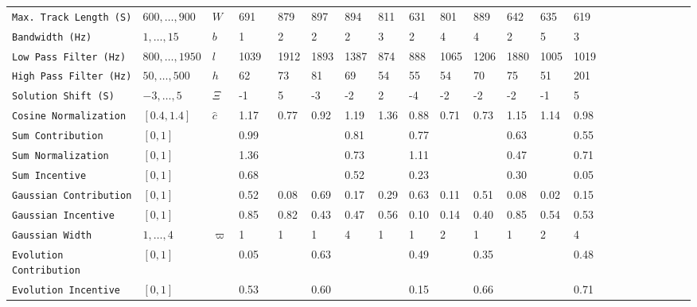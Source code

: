 \documentclass[twocolumn]{article}
\begin{document}
\begin{table}[h]
{\begin{tabular}{llll@{}llllllllllllllllll@{}}
		\texttt{Max. Track Length (S) }     & $600,\ldots,900$  & $W$        & 691   & 879  & 897  & 894  & 811  & 631  & 801  & 889  & 642  & 635  & 619  &  \\
		\texttt{Bandwidth (Hz)      }       & $1,\ldots,15$     & $b$        & 1     & 2    & 2    & 2    & 3    & 2    & 4    & 4    & 2    & 5    & 3    &  \\
		\texttt{Low Pass Filter (Hz) }      & $800,\ldots,1950$ & $l$        & 1039~ & 1912 & 1893 & 1387 & 874  & 888  & 1065 & 1206 & 1880 & 1005 & 1019 &  \\
		\texttt{High Pass Filter (Hz)}      & $50,\ldots,500$   & $h$        & 62    & 73   & 81   & 69   & 54   & 55   & 54   & 70   & 75   & 51   & 201  &  \\
		\texttt{Solution Shift (S) }        & $-3,\ldots,5$     & $ \varXi $ & -1    & 5    & -3   & -2   & 2    & -4   & -2   & -2   & -2   & -1   & 5    &  \\
		\texttt{Cosine Normalization }      & $[0.4,1.4]$       & $\hat c$   & 1.17  & 0.77 & 0.92 & 1.19 & 1.36 & 0.88 & 0.71 & 0.73 & 1.15 & 1.14 & 0.98 &  \\ \midrule
		\texttt{Sum Contribution  }         & $[0,1]$           &            & 0.99  &      &      & 0.81 &      & 0.77 &      &      & 0.63 &      & 0.55 &  \\
		\texttt{Sum Normalization }         & $[0,1]$           &            & 1.36  &      &      & 0.73 &      & 1.11 &      &      & 0.47 &      & 0.71 &  \\
		\texttt{Sum Incentive      }        & $[0,1]$           &            & 0.68  &      &      & 0.52 &      & 0.23 &      &      & 0.30 &      & 0.05 &  \\ \midrule
		\texttt{Gaussian Contribution  }    & $[0,1]$           &            & 0.52  & 0.08 & 0.69 & 0.17 & 0.29 & 0.63 & 0.11 & 0.51 & 0.08 & 0.02 & 0.15 &  \\
		\texttt{Gaussian Incentive}         & $[0,1]$           &            & 0.85  & 0.82 & 0.43 & 0.47 & 0.56 & 0.10 & 0.14 & 0.40 & 0.85 & 0.54 & 0.53 &  \\
		\texttt{Gaussian Width  }           & $1,\ldots,4$      & $\varpi$   & 1     & 1    & 1    & 4    & 1    & 1    & 2    & 1    & 1    & 2    & 4    &  \\ \midrule
		\texttt{Evolution Contribution}     & $[0,1]$           &            & 0.05  &      & 0.63 &      &      & 0.49 &      & 0.35 &      &      & 0.48 &  \\
		\texttt{Evolution Incentive}        & $[0,1]$           &            & 0.53  &      & 0.60 &      &      & 0.15 &      & 0.66 &      &      & 0.71 &  \\

\end{tabular}}
\end{table}
\end{document}
